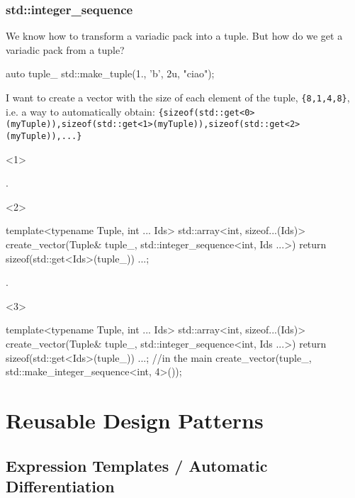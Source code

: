 \documentclass[aspectratio=43]{beamer}
\begin{document}
\begin{frame}[fragile]\frametitle{std::integer\_sequence}
  We know how to transform a variadic pack into a tuple. But how do we get a variadic pack \alert{from} a tuple?

\begin{Cpplisting}{}
auto tuple_ std::make_tuple(1., 'b', 2u, "ciao");
\end{Cpplisting}
I want to create a vector with the size of each element of the tuple, \verb~{8,1,4,8}~,
i.e. a way to automatically obtain:
{\tiny\verb~{sizeof(std::get<0>(myTuple)),sizeof(std::get<1>(myTuple)),sizeof(std::get<2>(myTuple)),...}~}

\begin{onlyenv}<1>
\begin{Cpplisting}{}







.
\end{Cpplisting}
\end{onlyenv}

\begin{onlyenv}<2>
\begin{Cpplisting}{}
template<typename Tuple, int ... Ids>
std::array<int, sizeof...(Ids)>
create_vector(Tuple& tuple_,
              std::integer_sequence<int, Ids ...>){
  return {sizeof(std::get<Ids>(tuple_)) ...};
}

.
\end{Cpplisting}
\end{onlyenv}

\begin{onlyenv}<3>
\begin{Cpplisting}{}
template<typename Tuple, int ... Ids>
std::array<int, sizeof...(Ids)>
create_vector(Tuple& tuple_,
              std::integer_sequence<int, Ids ...>){
  return {sizeof(std::get<Ids>(tuple_)) ...};
}
//in the main
create_vector(tuple_, std::make_integer_sequence<int, 4>());
\end{Cpplisting}
\end{onlyenv}
\end{frame}


\section{Reusable Design Patterns}
\subsection{Expression Templates / Automatic Differentiation}
\end{document}
